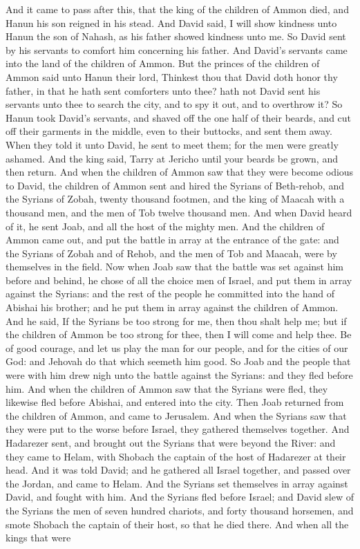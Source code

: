 And it came to pass after this, that the king of the children of Ammon died, and Hanun his son reigned in his stead. And David said, I will show kindness unto Hanun the son of Nahash, as his father showed kindness unto me. So David sent by his servants to comfort him concerning his father. And David’s servants came into the land of the children of Ammon. But the princes of the children of Ammon said unto Hanun their lord, Thinkest thou that David doth honor thy father, in that he hath sent comforters unto thee? hath not David sent his servants unto thee to search the city, and to spy it out, and to overthrow it? So Hanun took David’s servants, and shaved off the one half of their beards, and cut off their garments in the middle, even to their buttocks, and sent them away. When they told it unto David, he sent to meet them; for the men were greatly ashamed. And the king said, Tarry at Jericho until your beards be grown, and then return.  And when the children of Ammon saw that they were become odious to David, the children of Ammon sent and hired the Syrians of Beth-rehob, and the Syrians of Zobah, twenty thousand footmen, and the king of Maacah with a thousand men, and the men of Tob twelve thousand men. And when David heard of it, he sent Joab, and all the host of the mighty men. And the children of Ammon came out, and put the battle in array at the entrance of the gate: and the Syrians of Zobah and of Rehob, and the men of Tob and Maacah, were by themselves in the field.  Now when Joab saw that the battle was set against him before and behind, he chose of all the choice men of Israel, and put them in array against the Syrians: and the rest of the people he committed into the hand of Abishai his brother; and he put them in array against the children of Ammon. And he said, If the Syrians be too strong for me, then thou shalt help me; but if the children of Ammon be too strong for thee, then I will come and help thee. Be of good courage, and let us play the man for our people, and for the cities of our God: and Jehovah do that which seemeth him good. So Joab and the people that were with him drew nigh unto the battle against the Syrians: and they fled before him. And when the children of Ammon saw that the Syrians were fled, they likewise fled before Abishai, and entered into the city. Then Joab returned from the children of Ammon, and came to Jerusalem.  And when the Syrians saw that they were put to the worse before Israel, they gathered themselves together. And Hadarezer sent, and brought out the Syrians that were beyond the River: and they came to Helam, with Shobach the captain of the host of Hadarezer at their head. And it was told David; and he gathered all Israel together, and passed over the Jordan, and came to Helam. And the Syrians set themselves in array against David, and fought with him. And the Syrians fled before Israel; and David slew of the Syrians the men of seven hundred chariots, and forty thousand horsemen, and smote Shobach the captain of their host, so that he died there. And when all the kings that were 